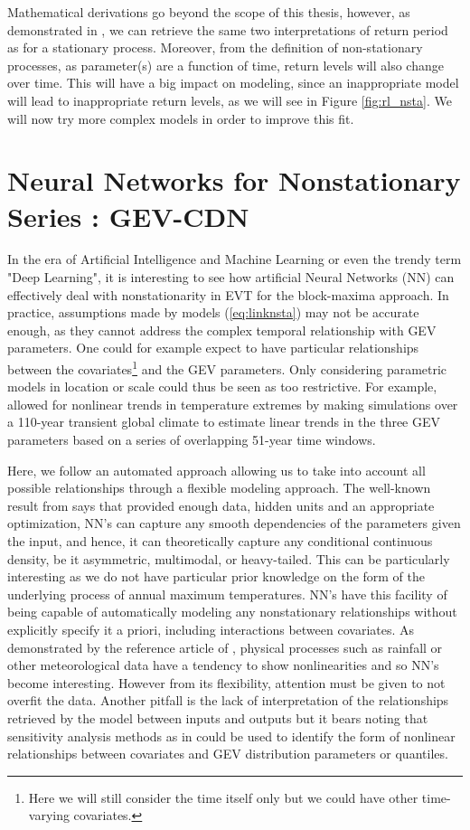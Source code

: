 Mathematical derivations go beyond the scope of this thesis, however, as demonstrated in \citet[Section 4.2]{ag_extremes_2013}, we can retrieve the same two interpretations of return period as for a stationary process. Moreover, from the definition of non-stationary processes, as parameter(s) are a function of time, return levels will also change over time. This will have a big impact on modeling, since an inappropriate model will lead to inappropriate return levels, as we will see in Figure \ref{fig:rl_nsta}. 
We will now try more complex models in order to improve this fit. 


\section{Neural Networks for Nonstationary Series : GEV-CDN}\label{sec:gevcdn}

In the era of Artificial Intelligence and Machine Learning or even the trendy term "Deep Learning", it is interesting to see how artificial Neural Networks (NN) can effectively deal with nonstationarity in EVT for the block-maxima approach. 
In practice, assumptions made by models (\ref{eq:linknsta}) may not be accurate enough, as they cannot address the complex temporal relationship with GEV parameters. One could for example expect to have particular relationships between the covariates\footnote{Here we will still consider the time itself only but we could have other time-varying covariates.} and the GEV parameters. Only considering parametric models in location or scale could thus be seen as too restrictive. For example, \citet{kharin_estimating_2005} allowed for nonlinear trends in temperature extremes by making simulations over a 110-year transient global climate to estimate linear trends in the three GEV parameters based on a series of overlapping 51-year time windows. 

Here, we follow an automated approach allowing us to take into account all possible relationships through a flexible modeling approach.
The well-known result from \cite{Hornik_1989} says that provided enough data, hidden units and an appropriate optimization, NN's can capture any smooth dependencies of the parameters given the input, and hence, it can theoretically capture any conditional continuous density, be it asymmetric, multimodal, or heavy-tailed. This can be particularly interesting as we do not have particular prior knowledge on the form of the underlying process of annual maximum temperatures. 
NN's have this facility of being capable of automatically modeling any nonstationary relationships without explicitly specify it a priori, including interactions between covariates. As demonstrated by the reference article of \citet{cannon_flexible_2010}, physical processes such as rainfall or other meteorological data have a tendency to show nonlinearities and so NN's become interesting. However from its flexibility, attention must be given to not overfit the data.  Another pitfall is the lack of interpretation of the relationships retrieved by the model between inputs and outputs but it bears noting that sensitivity analysis methods as in \citet{cannon_graph_2002} could be used to identify the form of nonlinear relationships between covariates and GEV distribution parameters or quantiles.



